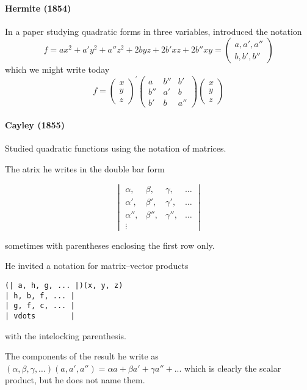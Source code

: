 \paragraph{Hermite (1854)~\cite{Hermite1854}}

In a paper studying quadratic forms in three variables, introduced the notation
\[
    f = ax^2 + a'y^2 + a''z^2 + 2byz + 2b'xz + 2b''xy
      = \begin{pmatrix}a,a',a''\\b,b',b''\end{pmatrix}
\]
which we might write today
\[
    f = \begin{pmatrix}x\\y\\z\end{pmatrix}^\prime
        \begin{pmatrix}a&b''&b'\\b''&a'&b\\b'&b&a''\end{pmatrix}
        \begin{pmatrix}x\\y\\z\end{pmatrix}
\]

\paragraph{Cayley (1855)~\cite{Cayley1855}}

Studied quadratic functions using the notation of matrices.

The atrix he writes in the double bar form

\[\begin{vmatrix}
\alpha,& \beta,& \gamma,& \dots \\
\alpha',& \beta',& \gamma',& \dots \\
\alpha'',& \beta'',& \gamma'',& \dots \\
\vdots
\end{vmatrix}\]

sometimes with parentheses enclosing the first row only.

He invited a notation for matrix--vector products

\begin{verbatim}
(| a, h, g, ... |)(x, y, z)
| h, b, f, ... |
| g, f, c, ... |
| vdots        |
\end{verbatim}
with the intelocking parenthesis.

The components of the result he write as $(\alpha, \beta, \gamma, \dots)(a, a', a'')
= \alpha a + \beta a' + \gamma a'' + ...$ which is clearly the scalar product,
but he does not name them.


